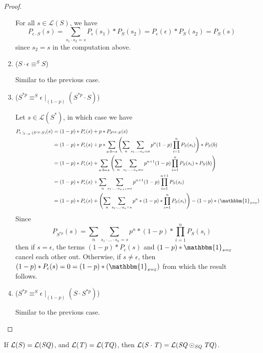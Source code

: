 \documentclass[acmsmall,screen,anonymous]{acmart}
\begin{document}
\begin{proof}
\begin{enumerate}
For all $s \in \mathcal{L}(S)$, we have
$$P_{\epsilon \cdot S}(s) = \sum_{s_1 \cdot s_2 = s}P_{\epsilon}(s_1) * P_S(s_2) = P_{\epsilon}(\epsilon) * P_S(s_2) = P_S(s)$$
since $s_2 = s$ in the computation above.
\item
($S \cdot \epsilon \equiv^S S$)

Similar to the previous case.
\item
($S^{*p} \equiv^S \epsilon \; |_{(1-p)} \; (S^{*p} \cdot S)$)

Let $s \in \mathcal{L}(S^*)$, in which case we have
\begin{align*}
P_{\epsilon \; |_{1-p} \; (S^{*p} \cdot S)}(s) &= (1-p) * P_{\epsilon}(s) + p * P_{S^{*p} \cdot S}(s)\\
&= (1-p) * P_{\epsilon}(s) + p * \sum_{a \cdot b = s}\left(\sum_n \sum_{s_1 \ldots \cdot s_n=a} p^n (1-p) \prod_{i=1}^n P_S(s_i)\right) * P_S(b)\\
&= (1-p) * P_{\epsilon}(s) + \sum_{a \cdot b = s}\left(\sum_n \sum_{s_1 \cdot \ldots \cdot s_n=s} p^{n+1} (1-p) \prod_{i=1}^n P_S(s_i) * P_S(b)\right)\\
&= (1-p) * P_{\epsilon}(s) + \sum_n \sum_{s_1 \cdot \ldots \cdot s_{n+1}=s} p^{n+1} (1-p) \prod_{i=1}^{n+1} P_S(s_i)\\
&= (1-p) * P_{\epsilon}(s) + \left(\sum_n \sum_{s_1 \cdot \ldots \cdot s_n = s} p^n * (1-p) * \prod_{i=1}^n P_S(s_i)\right) - (1-p) * (\mathbbm{1}_{s = \varepsilon})
\end{align*}
Since
$$
P_{S^{*p}}(s) = \sum_n \sum_{s_1 \cdot \ldots \cdot s_n = s} p^n * (1-p) * \prod_{i=1}^n P_S(s_i)
$$
then if $s = \epsilon$, the terms $(1-p) * P_{\epsilon}(s)$ and $(1-p) * \mathbbm{1}_{s=\varepsilon}$ cancel each other out. Otherwise, if $s \neq \epsilon$, then $(1-p) * P_{\epsilon}(s) = 0 = (1-p) * (\mathbbm{1}_{s = \varepsilon})$ from which the result follows.
\item
($S^{*p} \equiv^S \epsilon \; |_{(1-p)} \; (S \cdot S^{*p})$)

Similar to the previous case.
\end{enumerate}
\end{proof}
\begin{mylemma}
  If $\mathcal{L}(\mathit{S})=\mathcal{L}(\mathit{SQ})$,
  and $\mathcal{L}(\mathit{T})=\mathcal{L}(\mathit{TQ})$,
  then $\mathcal{L}(\mathit{S}\cdot\mathit{T})=\mathcal{L}(\mathit{SQ}\odot_{\mathit{SQ}}\mathit{TQ})$.
\end{mylemma}
\end{document}
